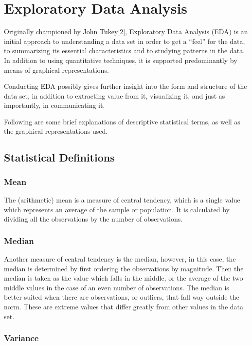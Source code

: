 \documentclass[]{article}
\begin{document}
\section{Exploratory Data Analysis}\label{exploratory-data-analysis}

Originally championed by John Tukey{[}2{]}, Exploratory Data Analysis
(EDA) is an initial approach to understanding a data set in order to get
a ``feel'' for the data, to summarizing its essential characteristics
and to studying patterns in the data. In addition to using quantitative
techniques, it is supported predominantly by means of graphical
representations.

Conducting EDA possibly gives further insight into the form and
structure of the data set, in addition to extracting value from it,
visualizing it, and just as importantly, in communicating it.

Following are some brief explanations of descriptive statistical terms,
as well as the graphical representations used.

\subsection{Statistical Definitions}\label{statistical-definitions}

\subsubsection{Mean}\label{mean}

The (arithmetic) mean is a measure of central tendency, which is a
single value which represents an average of the sample or population. It
is calculated by dividing all the observations by the number of
observations.

\subsubsection{Median}\label{median}

Another measure of central tendency is the median, however, in this
case, the median is determined by first ordering the observations by
magnitude. Then the median is taken as the value which falls in the
middle, or the average of the two middle values in the case of an even
number of observations. The median is better suited when there are
observations, or outliers, that fall way outside the norm. These are
extreme values that differ greatly from other values in the data set.

\subsubsection{Variance}\label{variance}
\end{document}

